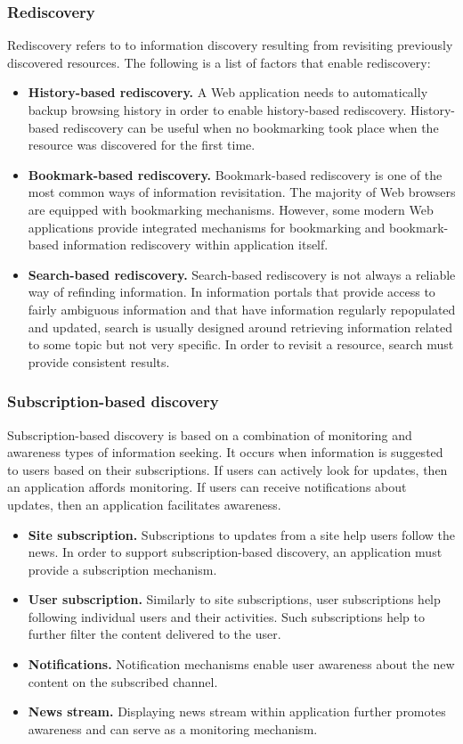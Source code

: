 \documentclass{casconpaper}
\begin{document}
{\subsubsection{Rediscovery}
Rediscovery refers to to information discovery resulting from revisiting previously discovered resources. The following is a list of factors that enable rediscovery:
\begin{itemize}
  \item \textbf{History-based rediscovery.} A Web application needs to automatically backup browsing history in order to enable history-based rediscovery. History-based rediscovery can be useful when no bookmarking took place when the resource was discovered for the first time.  
  \item \textbf{Bookmark-based rediscovery.} Bookmark-based rediscovery is one of the most common ways of information revisitation. The majority of Web browsers are equipped with bookmarking mechanisms. However, some modern Web applications provide integrated mechanisms for bookmarking and bookmark-based information rediscovery within application itself.
  \item \textbf{Search-based rediscovery.} Search-based rediscovery is not always a reliable way of refinding information. In information portals that provide access to fairly ambiguous information and that have information regularly repopulated and updated,   search is usually designed around retrieving information related to some topic but not very specific. In order to revisit a resource, search must provide consistent results.
\end{itemize}
} %

{\subsubsection{Subscription-based discovery}
Subscription-based discovery is based on a combination of monitoring and awareness types of information seeking. It occurs when information is suggested to users based on their subscriptions. If users can actively look for updates, then an application affords monitoring. If users can receive notifications about updates, then an application facilitates awareness.                            

\begin{itemize}
  \item \textbf{Site subscription.} Subscriptions to updates from a site help users follow the news. In order to support subscription-based discovery, an application must provide a subscription mechanism.
  \item \textbf{User subscription.} Similarly to site subscriptions, user subscriptions  help following individual users and their activities. Such subscriptions help to further filter the content delivered to the user.
  \item \textbf{Notifications.} Notification mechanisms enable user awareness about the  new content on the subscribed channel. 
  \item \textbf{News stream.} Displaying news stream within application further promotes awareness and can serve as a monitoring mechanism.
\end{itemize}
} %
\end{document}
